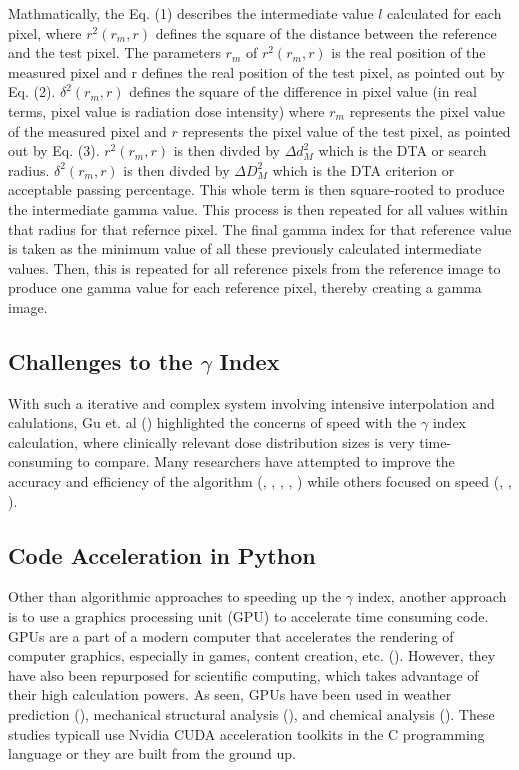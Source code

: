\documentclass[12pt]{article}
\begin{document}
Mathmatically, the Eq. (1) describes the intermediate value $l$ calculated for each pixel, where $r^{2}(r_{m}, r)$ defines the square of the distance between the reference and the test pixel. The parameters $r_{m}$ of $r^{2}(r_{m}, r)$ is the real position of the measured pixel and r defines the real position of the test pixel, as pointed out by Eq. (2). $\delta^{2}(r_{m}, r)$ defines the square of the difference in pixel value (in real terms, pixel value is radiation dose intensity) where $r_{m}$ represents the pixel value of the measured pixel and $r$ represents the pixel value of the test pixel, as pointed out by Eq. (3). $r^{2}(r_{m}, r)$ is then divded by $\Delta d^{2}_{M}$ which is the DTA or search radius. $\delta^{2}(r_{m}, r)$ is then divded by $\Delta D^{2}_{M}$ which is the DTA criterion or acceptable passing percentage. This whole term is then square-rooted to produce the intermediate gamma value. This process is then repeated for all values within that radius for that refernce pixel. The final gamma index for that reference value is taken as the minimum value of all these previously calculated intermediate values. Then, this is repeated for all reference pixels from the reference image to produce one gamma value for each reference pixel, thereby creating a gamma image.

\subsection{Challenges to the $\gamma$ Index}
With such a iterative and complex system involving intensive interpolation and calulations, Gu et. al (\textcite{Gu}) highlighted the concerns of speed with the $\gamma$ index calculation, where clinically relevant dose distribution sizes is very time-consuming to compare. Many researchers have attempted to improve the accuracy and efficiency of the algorithm (\textcite{Bakai}, \textcite{Depuydt}, \textcite{Stock}, \textcite{Jiang}, \textcite{Spezi}) while others focused on speed (\textcite{Ju}, \textcite{Chen}, \textcite{Wendling}).

\subsection{Code Acceleration in Python}
Other than algorithmic approaches to speeding up the $\gamma$ index, another approach is to use a graphics processing unit (GPU) to accelerate time consuming code. GPUs are a part of a modern computer that accelerates the rendering of computer graphics, especially in games, content creation, etc. (\textcite{intel}). However, they have also been repurposed for scientific computing, which takes advantage of their high calculation powers. As seen, GPUs have been used in weather prediction (\textcite{Michalakes}), mechanical structural analysis (\textcite{Georgescu}), and chemical analysis (\textcite{Ma}). These studies typicall use Nvidia CUDA acceleration toolkits in the C programming language or they are built from the ground up.
\end{document}
